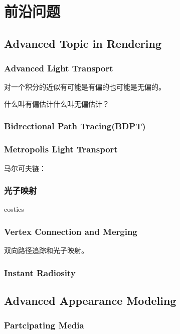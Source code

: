 \chapter{前沿问题}

\section{Advanced Topic in Rendering}

\subsection*{Advanced Light Transport}

对一个积分的近似有可能是有偏的也可能是无偏的。

什么叫有偏估计什么叫无偏估计？

\subsection*{Bidrectional Path Tracing(BDPT)}

\subsection*{Metropolis Light Transport}

马尔可夫链：

\subsection*{光子映射}

costics

\subsection*{Vertex Connection and Merging}

双向路径追踪和光子映射。

\subsection*{Instant Radiosity}

\section{Advanced Appearance Modeling}

\subsection*{Partcipating Media}

